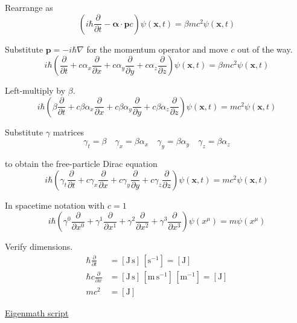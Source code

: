 Rearrange as
\begin{equation*}
\left(i\hbar\frac{\partial }{\partial t}
-\boldsymbol\alpha\cdot\mathbf pc\right)\psi(\mathbf x,t)
=\beta mc^2\psi(\mathbf x,t)
\end{equation*}

Substitute $\mathbf p=-i\hbar\nabla$ for the momentum operator
and move $c$ out of the way.
\begin{equation*}
i\hbar\left(\frac{\partial }{\partial t}
+c\alpha_x\frac{\partial}{\partial x}
+c\alpha_y\frac{\partial}{\partial y}
+c\alpha_z\frac{\partial}{\partial z}
\right)\psi(\mathbf x,t)
=\beta mc^2\psi(\mathbf x,t)
\end{equation*}

Left-multiply by $\beta$.
\begin{equation*}
i\hbar\left(\beta\frac{\partial}{\partial t}
+c\beta\alpha_x\frac{\partial}{\partial x}
+c\beta\alpha_y\frac{\partial}{\partial y}
+c\beta\alpha_z\frac{\partial}{\partial z}
\right)\psi(\mathbf x,t)
=mc^2\psi(\mathbf x,t)
\end{equation*}

Substitute $\gamma$ matrices
\begin{equation*}
\gamma_t=\beta\quad
\gamma_x=\beta\alpha_x\quad
\gamma_y=\beta\alpha_y\quad
\gamma_z=\beta\alpha_z
\end{equation*}

to obtain the free-particle Dirac equation
\begin{equation*}
i\hbar\left(
\gamma_t\frac{\partial}{\partial t}
+c\gamma_x\frac{\partial}{\partial x}
+c\gamma_y\frac{\partial}{\partial y}
+c\gamma_z\frac{\partial}{\partial z}
\right)\psi(\mathbf x,t)
=mc^2\psi(\mathbf x,t)
\end{equation*}

In spacetime notation with $c=1$
\begin{equation*}
i\hbar\left(
\gamma^0\frac{\partial}{\partial x^0}
+\gamma^1\frac{\partial}{\partial x^1}
+\gamma^2\frac{\partial}{\partial x^2}
+\gamma^3\frac{\partial}{\partial x^3}
\right)\psi(x^\mu)
=m\psi(x^\mu)
\end{equation*}

Verify dimensions.
\begin{align*}
\hbar\frac{\partial}{\partial t}&=[\text{J}\,\text{s}]\,[\text{s}^{-1}]=[\text{J}]
\\[1ex]
\hbar c\frac{\partial}{\partial x}
&=[\text{J}\,\text{s}]\,[\text{m}\,\text{s}^{-1}]\,[\text{m}^{-1}]=[\text{J}]
\\[1ex]
mc^2&=[\text{J}]
\end{align*}

\href{https://georgeweigt.github.io/examples/dirac-equation-1-demo.html}{Eigenmath script}


